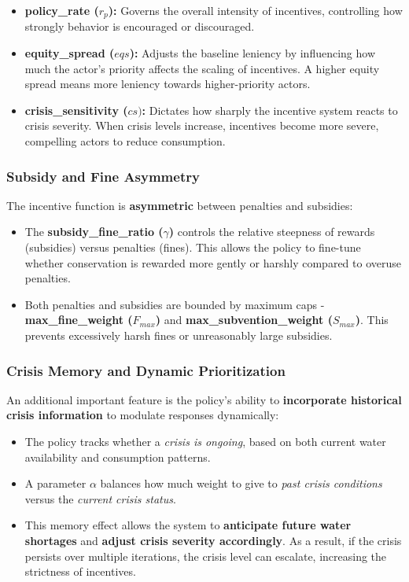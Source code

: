 \documentclass[ruler]{CUP-JNL-EDS}%
\begin{document}
\begin{itemize}
    \item \textbf{policy\_rate ($r_p$):} Governs the overall intensity of incentives, controlling how strongly behavior 
    is encouraged or discouraged.
    \item \textbf{equity\_spread ($eqs$):} Adjusts the baseline leniency by influencing how much the actor’s priority 
    affects the scaling of incentives. A higher equity spread means more leniency towards higher-priority actors.
    \item \textbf{crisis\_sensitivity ($cs)$:} Dictates how sharply the incentive system reacts to crisis severity. 
    When crisis levels increase, incentives become more severe, compelling actors to reduce consumption.
\end{itemize}

\subsubsection*{Subsidy and Fine Asymmetry}
The incentive function is \textbf{asymmetric} between penalties and subsidies:

\begin{itemize}
    \item The \textbf{subsidy\_fine\_ratio ($\gamma$)} controls the relative steepness of rewards (subsidies) versus penalties 
    (fines). This allows the policy to fine-tune whether conservation is rewarded more gently or harshly compared to overuse penalties.
    \item Both penalties and subsidies are bounded by maximum caps - \textbf{max\_fine\_weight ($F_{max}$)} and 
    \textbf{max\_subvention\_weight ($S_{max}$)}. This prevents excessively harsh fines or unreasonably large subsidies.
\end{itemize}

\subsubsection*{Crisis Memory and Dynamic Prioritization}
An additional important feature is the policy’s ability to \textbf{incorporate historical crisis information} to 
modulate responses dynamically:

\begin{itemize}
    \item The policy tracks whether a \textit{crisis is ongoing}, based on both current water availability and 
    consumption patterns.
    \item A parameter \(\alpha\) balances how much weight to give to \textit{past crisis conditions} versus the 
    \textit{current crisis status}.
    \item This memory effect allows the system to \textbf{anticipate future water shortages} and 
    \textbf{adjust crisis severity accordingly}. As a result, if the crisis persists over multiple iterations, the crisis level can escalate, increasing 
    the strictness of incentives.

\end{itemize}
\end{document}
